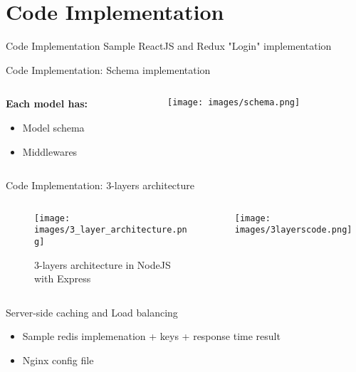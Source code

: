 \documentclass{beamer}
\begin{document}
\section{Code Implementation}
	
\begin{frame}{Code Implementation}
Sample ReactJS and Redux "Login" implementation
\end{frame}

\begin{frame}{Code Implementation: Schema implementation}
    \begin{columns}
    \hspace{-0.5cm}
    \vspace{-2cm}
    \begin{column}{4cm}
    \textbf{Each model has:}
    \begin{itemize}
        \item Model schema
        \item Middlewares
    \end{itemize}
    \end{column}
    
    \begin{column}{6cm}
    \texttt{[image: images/schema.png]}
    \end{column}
    \end{columns}
\end{frame}

\begin{frame}{Code Implementation: 3-layers architecture}
\begin{columns}
    \linespread{1.0}
    \hspace{-1cm}
     \begin{column}{5cm}
        \begin{figure}[htp]
            \centering
            \texttt{[image: images/3\_layer\_architecture.png]}
            \caption{3-layers architecture in NodeJS with Express}
            \label{fig:sysarch}
        \end{figure}  
    \end{column}
    \hspace{-1cm}
    \begin{column}{5cm}
        \texttt{[image: images/3layerscode.png]}
    \end{column}
    \end{columns}
\end{frame}

\begin{frame}[fragile]{Server-side caching and Load balancing}
\begin{itemize}
    \item Sample redis implemenation + keys + response time result
    \item Nginx config file
\end{itemize}
\end{frame}
\end{document}
